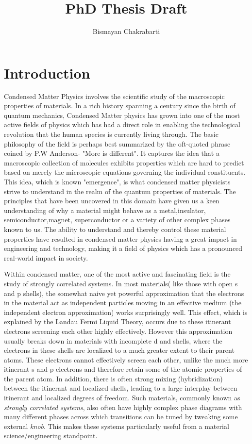\documentclass[12pt,a4paper]{article}
\begin{document}
\title{PhD Thesis Draft}
\date{}
\author{Bismayan Chakrabarti}
\maketitle
\pagebreak

\section{Introduction}

Condensed Matter Physics involves the scientific study of the macroscopic properties of materials. In a rich history spanning a century since the birth of quantum mechanics, Condensed Matter physics has grown into one of the most active fields of physics which has had a direct role in enabling the technological revolution that the human species is currently living through. The basic philosophy of the field is perhaps best summarized by the oft-quoted phrase coined by P.W Anderson- "More is different". It captures the idea that a macroscopic collection of molecules exhibits properties which are hard to predict based on merely the microscopic equations governing the individual constituents. This idea, which is known "emergence", is what condensed matter physicists strive to understand in the realm of the quantum properties of materials. The principles that have been uncovered in this domain have given us a keen understanding of why a material might behave as a metal,insulator, semiconductor,magnet, superconductor or a variety of other complex phases known to us. The ability to understand and thereby control these material properties have resulted in condensed matter physics having a great impact in engineering and technology, making it a field of physics which has a pronounced real-world impact in society.
\linebreak

Within condensed matter, one of the most active and fascinating field is the study of strongly correlated systems. In most materials( like those with open s and p shells), the somewhat naive yet powerful approximation that the electrons in the material act as independent particles moving in an effective medium (the independent electron approximation) works surprisingly well. This effect, which is explained by the Landau Fermi Liquid Theory, occurs due to these itinerant electrons screening each other highly effectively. However this approximation usually breaks down in materials with incomplete d and shells, where the electrons in these shells are localized to a much greater extent to their parent atoms. These electrons cannot effectively screen each other, unlike the much more itinerant s and p electrons and therefore retain some of the atomic properties of the parent atom. In addition, there is often strong mixing (hybridization) between the itinerant and localized shells, leading to a large interplay between itinerant and localized degrees of freedom. Such materials, commonly known as \textit{strongly correlated systems}, also often have highly complex phase diagrams with many different phases across which transitions can be tuned by tweaking some external \textit{knob}. This makes these systems particularly useful from a material science/engineering standpoint.
\end{document}
